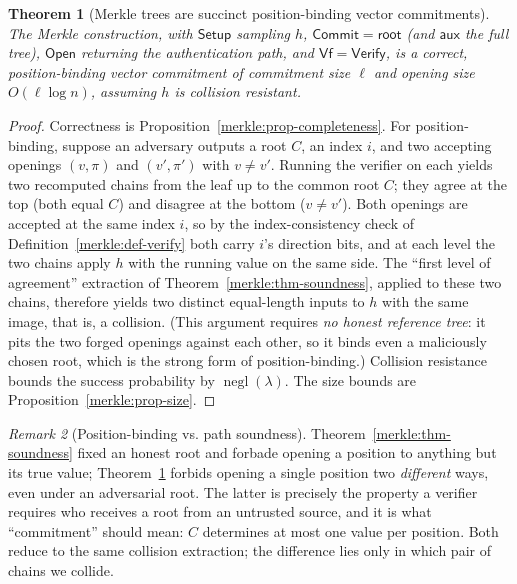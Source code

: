 \documentclass[11pt,a4paper]{article}
\newtheorem{theorem}{Theorem}[section]
\theoremstyle{definition}
\theoremstyle{remark}
\newtheorem{remark}[theorem]{Remark}
\DeclareMathOperator{\negl}{negl}
\begin{document}
\begin{theorem}[Merkle trees are succinct position-binding vector commitments]\label{merkle:thm-merkle-vc}
The Merkle construction, with \(\mathsf{Setup}\) sampling \(h\), \(\mathsf{Commit} = \mathsf{root}\) (and \(\mathsf{aux}\) the full tree), \(\mathsf{Open}\) returning the authentication path, and \(\mathsf{Vf} = \mathsf{Verify}\), is a correct, position-binding vector commitment of commitment size \(\ell\) and opening size \(O(\ell \log n)\), assuming \(h\) is collision resistant.
\end{theorem}

\begin{proof}
Correctness is Proposition~\ref{merkle:prop-completeness}. For position-binding, suppose an adversary outputs a root \(C\), an index \(i\), and two accepting openings \((v, \pi)\) and \((v', \pi')\) with \(v \neq v'\). Running the verifier on each yields two recomputed chains from the leaf up to the common root \(C\); they agree at the top (both equal \(C\)) and disagree at the bottom (\(v \neq v'\)). Both openings are accepted at the same index \(i\), so by the index-consistency check of Definition~\ref{merkle:def-verify} both carry \(i\)'s direction bits, and at each level the two chains apply \(h\) with the running value on the same side. The ``first level of agreement'' extraction of Theorem~\ref{merkle:thm-soundness}, applied to these two chains, therefore yields two distinct equal-length inputs to \(h\) with the same image, that is, a collision. (This argument requires \emph{no honest reference tree}: it pits the two forged openings against each other, so it binds even a maliciously chosen root, which is the strong form of position-binding.) Collision resistance bounds the success probability by \(\negl(\lambda)\). The size bounds are Proposition~\ref{merkle:prop-size}.
\end{proof}

\begin{remark}[Position-binding vs. path soundness]\label{merkle:rem-binding-vs-sound}
Theorem~\ref{merkle:thm-soundness} fixed an honest root and forbade opening a position to anything but its true value; Theorem~\ref{merkle:thm-merkle-vc} forbids opening a single position two \emph{different} ways, even under an adversarial root. The latter is precisely the property a verifier requires who receives a root from an untrusted source, and it is what ``commitment'' should mean: \(C\) determines at most one value per position. Both reduce to the same collision extraction; the difference lies only in which pair of chains we collide.
\end{remark}
\end{document}
